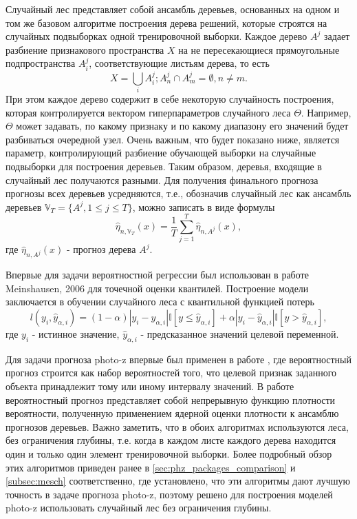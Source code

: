 \documentclass[fleqn,usenatbib]{mnras}
\begin{document}
Случайный лес \cite{bib:forests_brieman} представляет собой ансамбль деревьев, основанных на одном и том же базовом алгоритме построения дерева решений, которые строятся на случайных подвыборках одной тренировочной выборки. Каждое дерево \(A^j\) задает разбиение признакового пространства \(X\) на не пересекающиеся прямоугольные подпространства \(A^j_i\), соответствующие листьям дерева, то есть
\begin{equation}
    X = \bigcup_i {A^j_i}; A^j_n \cap A^j_m = \emptyset, n \neq m.
\end{equation}
При этом каждое дерево содержит в себе некоторую случайность построения, которая контролируется вектором гиперпараметров случайного леса \(\Theta\). Например, \(\Theta\) может задавать, по какому признаку и по какому диапазону его значений будет разбиваться очередной узел. Очень важным, что будет показано ниже, является параметр, контролирующий разбиение обучающей выборки на случайные подвыборки для построения деревьев. Таким образом, деревья, входящие в случайный лес получаются разными. Для получения финального прогноза прогнозы всех деревьев усредняются, т.е., обозначив случайный лес как ансамбль деревьев \(\mathbb{V}_T = \{A^j, 1 \leq j \leq T\}\), можно записать в виде формулы
\begin{equation}
    \hat{\eta}_{n, \mathbb{V}_T}(x) = \frac{1}{T} \sum_{j=1}^T \hat\eta_{n, A^j}(x),
\end{equation}
где \(\hat\eta_{n, A^j}(x)\) - прогноз дерева \(A^j\).

Впервые для задачи вероятностной регрессии был использован в работе Meinshausen, 2006 \cite{bib:forests_meinshausen} для точечной оценки квантилей. Построение модели заключается в обучении случайного леса с квантильной функцией потерь 
\begin{equation}
    l(y_i, \hat{y}_{\alpha, i}) = (1-\alpha)|y_i - \hat{y}_{\alpha, i}|\mathbb{I}[y \leq \hat{y}_{\alpha, i}] + \alpha|y_i - \hat{y}_{\alpha, i}|\mathbb{I}[y > \hat{y}_{\alpha, i}],
\end{equation}
где \(y_i\) - истинное значение, \(\hat{y}_{\alpha, i}\) - предсказанное значений целевой переменной.

Для задачи прогноза photo-z впервые был применен в работе \cite{bib:tpz}, где вероятностный прогноз строится как набор вероятностей того, что целевой признак заданного объекта принадлежит тому или иному интервалу значений. В работе \cite{bib:mesch} вероятностный прогноз представляет собой непрерывную функцию плотности вероятности, полученную применением ядерной оценки плотности к ансамблю прогнозов деревьев. Важно заметить, что в обоих алгоритмах используются леса, без ограничения глубины, т.е. когда в каждом листе каждого дерева находится один и только один элемент тренировочной выборки. Более подробный обзор этих алгоритмов приведен ранее в \ref{sec:phz_packages_comparison} и \ref{subsec:mesch} соответственно, где установлено, что эти алгоритмы дают лучшую точность в задаче прогноза photo-z, поэтому решено для построения моделей photo-z использовать случайный лес без ограничения глубины.
\end{document}
